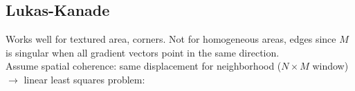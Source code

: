\subsection*{Lukas-Kanade}
Works well for textured area, corners. Not for homogeneous areas, edges since $M$ is singular when all gradient vectors point in the same direction.\\
Assume spatial coherence: same displacement for neighborhood ($N \times M$ window) $\rightarrow$ linear least squares problem:\\
\\
